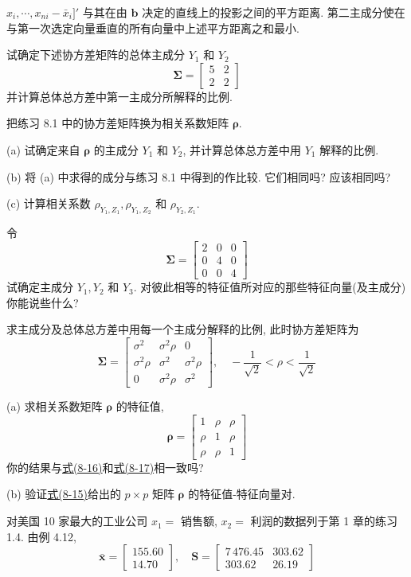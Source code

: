 
$x_i,\cdots,x_{ni}-\bar{x}_i]'$ 与其在由 $\mathbf{b}$ 决定的直线上的投影之间的平方距离. 第二主成分使在与第一次选定向量垂直的所有向量中上述平方距离之和最小.


\quad 试确定下述协方差矩阵的总体主成分 $Y_1$ 和 $Y_2$
\[
\boldsymbol{\Sigma}=\begin{bmatrix}5&2\\2&2\end{bmatrix}
\]
并计算总体总方差中第一主成分所解释的比例.

\quad 把练习 8.1 中的协方差矩阵换为相关系数矩阵 $\boldsymbol{\rho}$.

(a) 试确定来自 $\boldsymbol{\rho}$ 的主成分 $Y_1$ 和 $Y_2$, 并计算总体总方差中用 $Y_1$ 解释的比例.

(b) 将 (a) 中求得的成分与练习 8.1 中得到的作比较. 它们相同吗? 应该相同吗?

(c) 计算相关系数 $\rho_{Y_1,Z_1},\rho_{Y_1,Z_2}$ 和 $\rho_{Y_2,Z_1}$.

\quad 令
\[
\boldsymbol{\Sigma}=\begin{bmatrix}2&0&0\\0&4&0\\0&0&4\end{bmatrix}
\]
试确定主成分 $Y_1,Y_2$ 和 $Y_3$. 对彼此相等的特征值所对应的那些特征向量(及主成分)你能说些什么?

\quad 求主成分及总体总方差中用每一个主成分解释的比例, 此时协方差矩阵为
\[
\boldsymbol{\Sigma}=\begin{bmatrix}\sigma^2&\sigma^2\rho&0\\\sigma^2\rho&\sigma^2&\sigma^2\rho\\0&\sigma^2\rho&\sigma^2\end{bmatrix},\quad -\frac{1}{\sqrt{2}}<\rho<\frac{1}{\sqrt{2}}
\]

\quad (a) 求相关系数矩阵 $\boldsymbol{\rho}$ 的特征值,
\[
\boldsymbol{\rho}=\begin{bmatrix}1&\rho&\rho\\\rho&1&\rho\\\rho&\rho&1\end{bmatrix}
\]
你的结果与\hyperref[eq:8-16]{式(8-16)}和\hyperref[eq:8-17]{式(8-17)}相一致吗?

(b) 验证\hyperref[eq:8-15]{式(8-15)}给出的 $p\times p$ 矩阵 $\boldsymbol{\rho}$ 的特征值-特征向量对.

\quad 对美国 10 家最大的工业公司 $x_1=$ 销售额, $x_2=$ 利润的数据列于第 1 章的练习 1.4. 由例 4.12,
\[
\bar{\mathbf{x}}=\begin{bmatrix}155.60\\14.70\end{bmatrix},\quad \mathbf{S}=\begin{bmatrix}7\,476.45&303.62\\303.62&26.19\end{bmatrix}
\]

